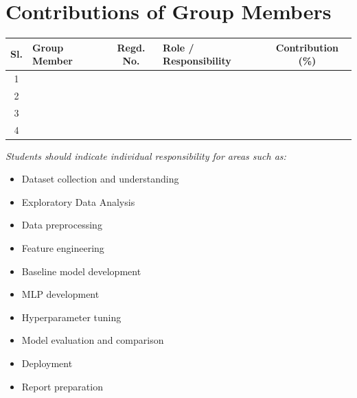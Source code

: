 \documentclass[12pt, a4paper]{article}
\begin{document}
\section{Contributions of Group Members}

\noindent
\begin{tabularx}{\textwidth}{|c|X|c|X|c|}
\hline
\textbf{Sl.} & \textbf{Group Member} & \textbf{Regd. No.} & \textbf{Role / Responsibility} & \textbf{Contribution (\%)} \\
\hline
1 & & & & \\
\hline
2 & & & & \\
\hline
3 & & & & \\
\hline
4 & & & & \\
\hline
\end{tabularx}

\vspace{0.5cm}
\noindent \textit{Students should indicate individual responsibility for areas such as:}
\begin{itemize}[noitemsep, topsep=5pt]
    \item Dataset collection and understanding 
    \item Exploratory Data Analysis 
    \item Data preprocessing 
    \item Feature engineering 
    \item Baseline model development 
    \item MLP development 
    \item Hyperparameter tuning 
    \item Model evaluation and comparison 
    \item Deployment 
    \item Report preparation 
\end{itemize}
\end{document}
